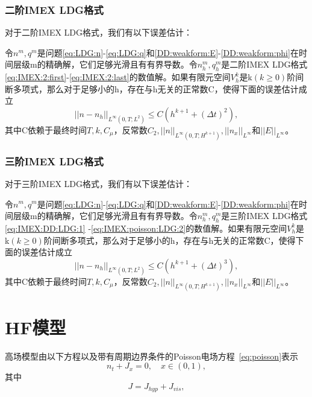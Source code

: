 \subsubsection{二阶IMEX LDG格式}
对于二阶IMEX LDG格式，我们有以下误差估计\cite{liu2016analysis}：
\begin{theorem}
	令$n^m,q^m$是问题\eqref{eq:LDG:n}-\eqref{eq:LDG:q}和\eqref{DD:weakform:E}-\eqref{DD:weakform:phi}在时间层级m的精确解，它们足够光滑且有有界导数。令$n_h^m,q_h^m$是二阶IMEX LDG格式\eqref{eq:IMEX:2:first}-\eqref{eq:IMEX:2:last}的数值解。如果有限元空间$V_h^k$是k$(k\geq  0)$阶间断多项式，那么对于足够小的h，存在与h无关的正常数C，使得下面的误差估计成立
	\begin{equation}
		||n-n_h||_{L^{\infty}(0,T;L^2)} \leq C(h^{k+1} + (\Delta t)^2), \label{eq:IMEX:es:2}
	\end{equation}
	其中C依赖于最终时间$T,k,C_{\mu}$，反常数$C_2, ||n||_{L^{\infty}(0,T;H^{k+1})}, ||n_x||_{L^{\infty}}$和$||E||_{L^{\infty}}$。
\end{theorem}
\subsubsection{三阶IMEX LDG格式}
对于三阶IMEX LDG格式，我们有以下误差估计\cite{liu2016analysis}：
\begin{theorem}
	令$n^m,q^m$是问题\eqref{eq:LDG:n}-\eqref{eq:LDG:q}和\eqref{DD:weakform:E}-\eqref{DD:weakform:phi}在时间层级m的精确解，它们足够光滑且有有界导数。令$n_h^m,q_h^m$是三阶IMEX LDG格式\eqref{eq:IMEX:DD:LDG:1} -\eqref{eq:IMEX:poisson:LDG:2}的数值解。如果有限元空间$V_h^k$是k$(k\geq  0)$阶间断多项式，那么对于足够小的h，存在与h无关的正常数C，使得下面的误差估计成立
	\begin{equation}
		||n-n_h||_{L^{\infty}(0,T;L^2)} \leq C(h^{k+1} + (\Delta t)^3), \label{eq:IMEX:es:3}
	\end{equation}
	其中C依赖于最终时间$T,k,C_{\mu}$，反常数$C_2, ||n||_{L^{\infty}(0,T;H^{k+1})}, ||n_x||_{L^{\infty}}$和$||E||_{L^{\infty}}$。
\end{theorem}

\section{HF模型}
高场模型由以下方程以及带有周期边界条件的Poisson电场方程~\eqref{eq:poisson}表示
\begin{equation}
	n_{t}+J_{x}=0, \quad x \in(0,1) ,\label{eq:HF}
\end{equation}
其中
$$
	J=J_{h y p}+J_{v i s},
$$

